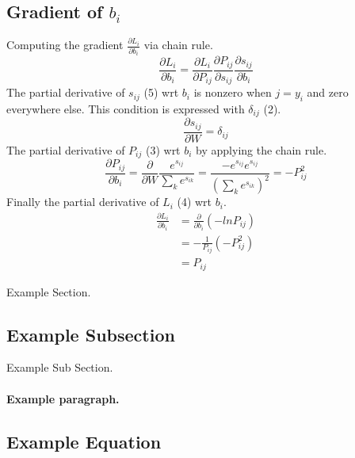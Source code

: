 \documentclass[12pt, letter]{article}
\begin{document}
\subsection{Gradient of $b_i$}
Computing the gradient $\frac{\partial L_i}{\partial b_i}$ via chain rule.
\begin{equation}\nonumber
  \frac{\partial L_i}{\partial b_i} =
  \frac{\partial L_i}{\partial P_{ij}} \frac{\partial P_{ij}}{\partial s_{ij}} \frac{\partial s_{ij}}{\partial b_i}
\end{equation}
The partial derivative of $s_{ij}$ (5) wrt $b_i$ is nonzero when $j=y_i$
and zero everywhere else. This condition is expressed with $\delta_{ij}$ (2).
\begin{equation}\nonumber
  \frac{\partial s_{ij}}{\partial W} = \delta_{ij}
\end{equation}
The partial derivative of $P_{ij}$ (3) wrt $b_i$ by applying the chain rule.
\begin{equation}\nonumber
  \frac{\partial P_{ij}}{\partial b_i} = \frac{\partial}{\partial W}\frac{e^{s_{ij}}}{\sum_ke^{s_{ik}}} = \frac{-e^{s_{ij}}e^{s_{ij}}}{\left(\sum_ke^{s_{ik}}\right)^2} = -P_{ij}^2
\end{equation}
Finally the partial derivative of $L_i$ (4) wrt $b_i$.
\begin{equation}
\begin{split}
  \frac{\partial L_i}{\partial b_i}& = \frac{\partial}{\partial b_i}\left(-lnP_{ij}\right)\\
  & = -\frac{1}{P_{ij}} (-P_{ij}^2) \\
  & = P_{ij}
\end{split}
\end{equation}


\pagebreak

Example Section.

\subsection{Example Subsection}

Example Sub Section.

\paragraph{Example paragraph.}


\subsection{Example  Equation}
\end{document}
